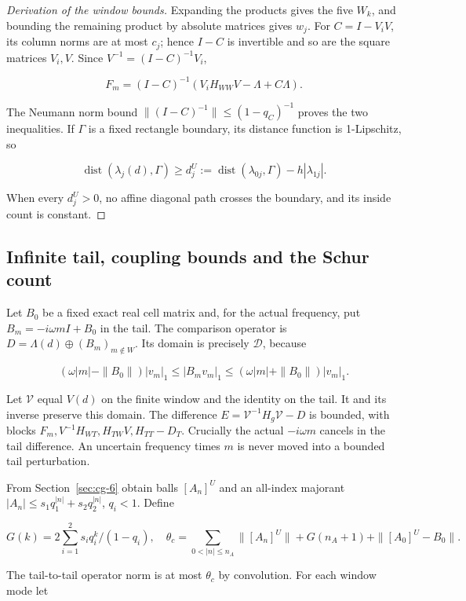 \documentclass[11pt]{article}
\theoremstyle{definition}
\begin{document}
\begin{proof}[Derivation of the window bounds] Expanding the products gives the five $W_k$, and bounding the remaining product by absolute matrices gives $w_j$. For $C=I-V_iV$, its column norms are at most $c_j$; hence $I-C$ is invertible and so are the square matrices $V_i,V$. Since $V^{-1}=(I-C)^{-1}V_i$,

\[
 F_m=(I-C)^{-1}(V_iH_{WW}V-\Lambda+C\Lambda).
\]

The Neumann norm bound $\|(I-C)^{-1}\|\le(1-q_C)^{-1}$ proves the two inequalities. If $\Gamma$ is a fixed rectangle boundary, its distance function is 1-Lipschitz, so

\[
 \operatorname{dist}(\lambda_j(d),\Gamma)
 \ge d_j^U:=\operatorname{dist}(\lambda_{0j},\Gamma)-h|\lambda_{1j}|.
\]

When every $d_j^U>0$, no affine diagonal path crosses the boundary, and its inside count is constant. \end{proof}

\subsection{Infinite tail, coupling bounds and the Schur count}\label{sec:cg-9}

Let $B_0$ be a fixed exact real cell matrix and, for the actual frequency, put $B_m=-i\omega mI+B_0$ in the tail. The comparison operator is $D=\Lambda(d)\oplus(B_m)_{m\notin W}$. Its domain is precisely $\mathcal D$, because

\[
 (\omega|m|-\|B_0\|)|v_m|_1\le|B_mv_m|_1
 \le(\omega|m|+\|B_0\|)|v_m|_1.
\]

Let $\mathcal V$ equal $V(d)$ on the finite window and the identity on the tail. It and its inverse preserve this domain. The difference $E=\mathcal V^{-1}H_g\mathcal V-D$ is bounded, with blocks $F_m,V^{-1}H_{WT},H_{TW}V,H_{TT}-D_T$. Crucially the actual $-i\omega m$ cancels in the tail difference. An uncertain frequency times $m$ is never moved into a bounded tail perturbation.

From Section~\ref{sec:cg-6} obtain balls $[A_n]^U$ and an all-index majorant $|A_n|\le s_1q_1^{|n|}+s_2q_2^{|n|}$, $q_i<1$. Define

\[
 G(k)=2\sum_{i=1}^2s_iq_i^k/(1-q_i),\quad
 \theta_c=\sum_{0<|n|\le n_A}\|[A_n]^U\|+G(n_A+1)
             +\|[A_0]^U-B_0\|.
\]

The tail-to-tail operator norm is at most $\theta_c$ by convolution. For each window mode let
\end{document}
